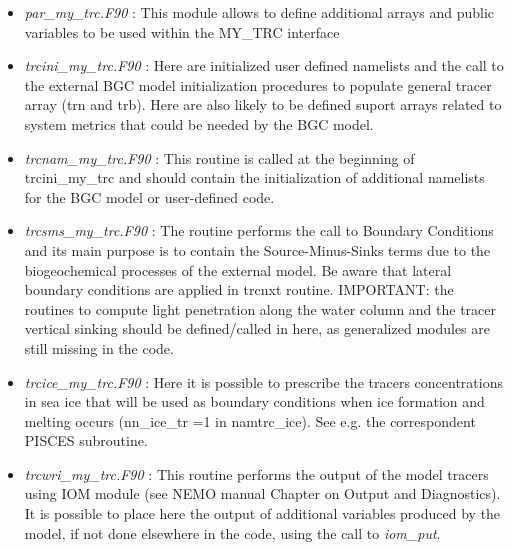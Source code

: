 \documentclass[../main/TOP_manual]{subfiles}
\begin{document}
\begin{itemize}
   \item \textit{par\_my\_trc.F90} :  This module allows to define additional arrays and public variables to be used within the MY\_TRC interface
   \item \textit{trcini\_my\_trc.F90} :  Here are initialized user defined namelists and the call to the external BGC model initialization procedures to populate general tracer array (trn and trb).
Here are also likely to be defined suport arrays related to system metrics that could be needed by the BGC model.
  \item \textit{trcnam\_my\_trc.F90} :  This routine is called at the beginning of trcini\_my\_trc and should contain the initialization of additional namelists for the BGC model or user-defined code.
  \item \textit{trcsms\_my\_trc.F90} :  The routine performs the call to Boundary Conditions and its main purpose is to contain the Source-Minus-Sinks terms due to the biogeochemical processes of the external model.
Be aware that lateral boundary conditions are applied in trcnxt routine.
IMPORTANT: the routines to compute light penetration along the water column and the tracer vertical sinking should be defined/called in here, as generalized modules are still missing in the code.
 \item \textit{trcice\_my\_trc.F90} : Here it is possible to prescribe the tracers concentrations in sea ice that will be used as boundary conditions when ice formation and melting occurs (nn\_ice\_tr =1 in namtrc\_ice).
See e.g. the correspondent PISCES subroutine.
 \item \textit{trcwri\_my\_trc.F90} : This routine performs the output of the model tracers using IOM module (see NEMO manual Chapter on Output and Diagnostics).
It is possible to place here the output of additional variables produced by the model, if not done elsewhere in the code, using the call to \textit{iom\_put}.
\end{itemize}
\end{document}
